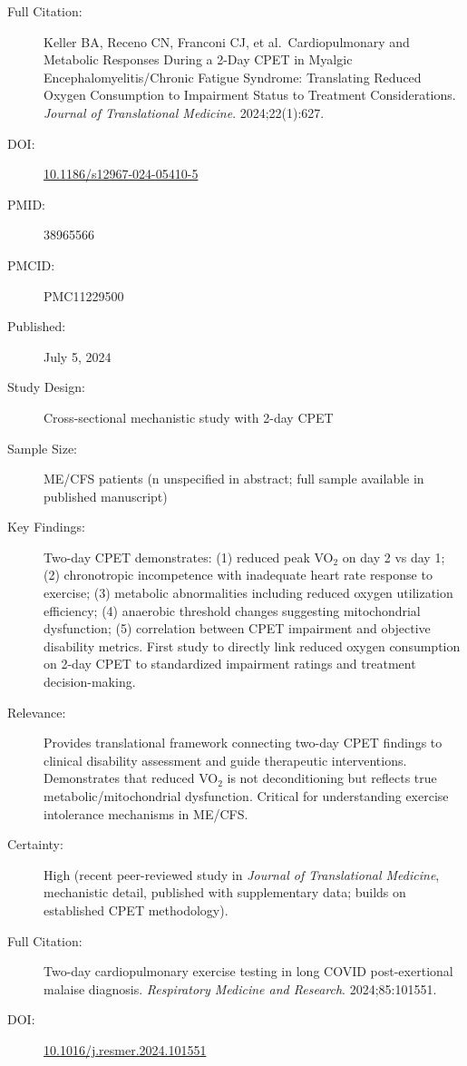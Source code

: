 \begin{description}
    \item[Full Citation:] Keller BA, Receno CN, Franconi CJ, et al.\ Cardiopulmonary and Metabolic Responses During a 2-Day CPET in Myalgic Encephalomyelitis/Chronic Fatigue Syndrome: Translating Reduced Oxygen Consumption to Impairment Status to Treatment Considerations. \textit{Journal of Translational Medicine}. 2024;22(1):627.
    \item[DOI:] \href{https://doi.org/10.1186/s12967-024-05410-5}{10.1186/s12967-024-05410-5}
    \item[PMID:] 38965566
    \item[PMCID:] PMC11229500
    \item[Published:] July 5, 2024
    \item[Study Design:] Cross-sectional mechanistic study with 2-day CPET
    \item[Sample Size:] ME/CFS patients (n unspecified in abstract; full sample available in published manuscript)
    \item[Key Findings:] Two-day CPET demonstrates: (1) reduced peak VO$_2$ on day 2 vs day 1; (2) chronotropic incompetence with inadequate heart rate response to exercise; (3) metabolic abnormalities including reduced oxygen utilization efficiency; (4) anaerobic threshold changes suggesting mitochondrial dysfunction; (5) correlation between CPET impairment and objective disability metrics. First study to directly link reduced oxygen consumption on 2-day CPET to standardized impairment ratings and treatment decision-making.
    \item[Relevance:] Provides translational framework connecting two-day CPET findings to clinical disability assessment and guide therapeutic interventions. Demonstrates that reduced VO$_2$ is not deconditioning but reflects true metabolic/mitochondrial dysfunction. Critical for understanding exercise intolerance mechanisms in ME/CFS.
    \item[Certainty:] High (recent peer-reviewed study in \textit{Journal of Translational Medicine}, mechanistic detail, published with supplementary data; builds on established CPET methodology).
\end{description}

\begin{description}
    \item[Full Citation:] Two-day cardiopulmonary exercise testing in long COVID post-exertional malaise diagnosis. \textit{Respiratory Medicine and Research}. 2024;85:101551.
    \item[DOI:] \href{https://doi.org/10.1016/j.resmer.2024.101551}{10.1016/j.resmer.2024.101551}
\end{description}

